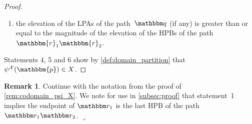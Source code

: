 \documentclass[11pt]{article}
\newcommand{\lrcornerqed}[0]{}
\renewcommand{\lrcornerqed}[0]{\hfill $\lrcorner$} %
\theoremstyle{definition} %
\numberwithin{equation}{section}
\newtheorem{remark}[thm]{Remark}
\begin{document}
\begin{proof}
    \begin{enumerate}
    \item[6.]
    the elevation of the LPAs of the path~$\mathbbm q$ (if any) is greater than or equal to the magnitude of the elevation of the HPBs of the path~$\mathbbm{r}_1 \mathbbm{r}_2$.
    \end{enumerate}
    
    Statements 4, 5 and 6 show by \cref{def:domain_partition} that $\psi^\mathcal X(\mathbbm{p}) \in X$.
\end{proof}


\begin{remark}
\label{rem:remark_after_psi_X_well-defined}
    Continue with the notation from the proof of \cref{rem:codomain_psi_X}.
    We note for use in \cref{subsec:proof} that statement~1 implies        
        the endpoint of $\mathbbm r_1$ is the last HPB of the path $\mathbbm r_1 \mathbbm r_2$. \lrcornerqed
\end{remark}
\end{document}
